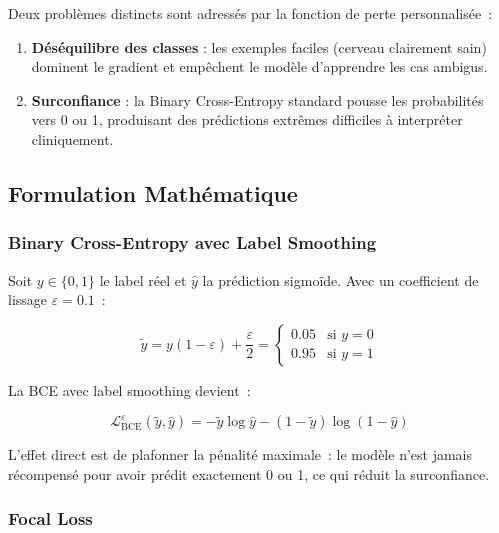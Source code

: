 \documentclass[12pt, a4paper]{report}
\begin{document}
Deux problèmes distincts sont adressés par la fonction de perte
personnalisée~:

\begin{enumerate}
  \item \textbf{Déséquilibre des classes} : les exemples faciles
        (cerveau clairement sain) dominent le gradient et empêchent
        le modèle d'apprendre les cas ambigus.
  \item \textbf{Surconfiance} : la Binary Cross-Entropy standard pousse
        les probabilités vers 0 ou 1, produisant des prédictions
        extrêmes difficiles à interpréter cliniquement.
\end{enumerate}

\subsection{Formulation Mathématique}

\subsubsection{Binary Cross-Entropy avec Label Smoothing}

Soit \(y \in \{0, 1\}\) le label réel et \(\hat{y}\) la prédiction
sigmoïde. Avec un coefficient de lissage \(\varepsilon = 0.1\)~:

\begin{equation}
  \label{eq:smooth_label}
  \tilde{y} = y(1 - \varepsilon) + \frac{\varepsilon}{2}
  = \begin{cases}
      0.05 & \text{si } y = 0 \\
      0.95 & \text{si } y = 1
    \end{cases}
\end{equation}

La BCE avec label smoothing devient~:

\begin{equation}
  \label{eq:bce_smooth}
  \mathcal{L}_{\text{BCE}}^{\varepsilon}(\tilde{y}, \hat{y})
  = -\tilde{y}\log\hat{y} - (1-\tilde{y})\log(1-\hat{y})
\end{equation}

L'effet direct est de plafonner la pénalité maximale~: le modèle n'est
jamais récompensé pour avoir prédit exactement 0 ou 1, ce qui réduit
la surconfiance.

\subsubsection{Focal Loss}
\end{document}
